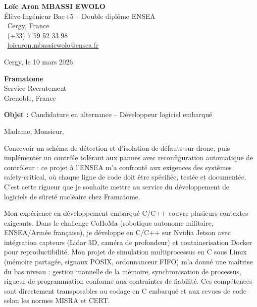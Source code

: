 \documentclass[a4paper,11pt]{article}
\begin{document}
\noindent
\begin{minipage}[t]{0.5\textwidth}
    \textbf{Loïc Aron MBASSI EWOLO}\\
    Élève-Ingénieur Bac+5 -- Double diplôme ENSEA\\[3pt]
    \faMapMarker\ Cergy, France\\
    \faPhone\ (+33) 7 59 52 33 98\\
    \faEnvelope\ \href{mailto:loicaron.mbassiewolo@ensea.fr}{loicaron.mbassiewolo@ensea.fr}
\end{minipage}
\hfill
\begin{minipage}[t]{0.4\textwidth}
    \raggedleft
    Cergy, le 10 mars 2026
\end{minipage}

\vspace{1.2cm}

\hfill
\begin{minipage}[t]{0.5\textwidth}
    \raggedleft
    \textbf{Framatome}\\
    Service Recrutement\\
    Grenoble, France
\end{minipage}

\vspace{1cm}

\noindent\textbf{Objet :} Candidature en alternance -- Développeur logiciel embarqué

\vspace{0.8cm}

Madame, Monsieur,

Concevoir un schéma de détection et d'isolation de défauts sur drone, puis implémenter un contrôle tolérant aux pannes avec reconfiguration automatique de contrôleur : ce projet à l'ENSEA m'a confronté aux exigences des systèmes safety-critical, où chaque ligne de code doit être spécifiée, testée et documentée. C'est cette rigueur que je souhaite mettre au service du développement de logiciels de sûreté nucléaire chez Framatome.

Mon expérience en développement embarqué C/C++ couvre plusieurs contextes exigeants. Dans le challenge CoHoMa (robotique autonome militaire, ENSEA/Armée française), je développe en C/C++ sur Nvidia Jetson avec intégration capteurs (Lidar 3D, caméra de profondeur) et containerisation Docker pour reproductibilité. Mon projet de simulation multiprocessus en C sous Linux (mémoire partagée, signaux POSIX, ordonnanceur FIFO) m'a donné une maîtrise du bas niveau : gestion manuelle de la mémoire, synchronisation de processus, rigueur de programmation conforme aux contraintes de fiabilité. Ces compétences sont directement transposables au codage en C embarqué et aux revues de code selon les normes MISRA et CERT.
\end{document}
